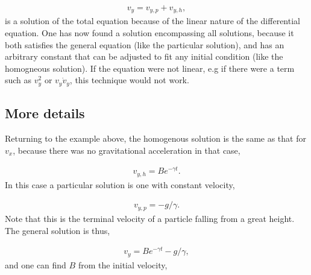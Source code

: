 \documentclass[letterpaper,10pt,english]{sphinxmanual}
\begin{document}
\begin{equation*}
\begin{split}
\begin{equation}
v_y=v_{y,p}+v_{y,h},
\label{_auto9} \tag{9}
\end{equation}
\end{split}
\end{equation*}
is a solution of the total equation because of the linear nature of
the differential equation. One has now found a  solution
encompassing all solutions, because it both satisfies the general
equation (like the particular solution), and has an arbitrary constant
that can be adjusted to fit any initial condition (like the homogneous
solution). If the equation were not linear, e.g if there were a term
such as \(v_y^2\) or \(v_y\dot{v}_y\), this technique would not work.


\subsection{More details}
\label{\detokenize{chapter2:more-details}}
Returning to the example above, the homogenous solution is the same as
that for \(v_x\), because there was no gravitational acceleration in
that case,




\begin{equation*}
\begin{split}
\begin{equation}
v_{y,h}=Be^{-\gamma t}.
\label{_auto10} \tag{10}
\end{equation}
\end{split}
\end{equation*}
In this case a particular solution is one with constant velocity,




\begin{equation*}
\begin{split}
\begin{equation}
v_{y,p}=-g/\gamma.
\label{_auto11} \tag{11}
\end{equation}
\end{split}
\end{equation*}
Note that this is the terminal velocity of a particle falling from a
great height. The general solution is thus,




\begin{equation*}
\begin{split}
\begin{equation}
v_y=Be^{-\gamma t}-g/\gamma,
\label{_auto12} \tag{12}
\end{equation}
\end{split}
\end{equation*}
and one can find \(B\) from the initial velocity,
\end{document}
